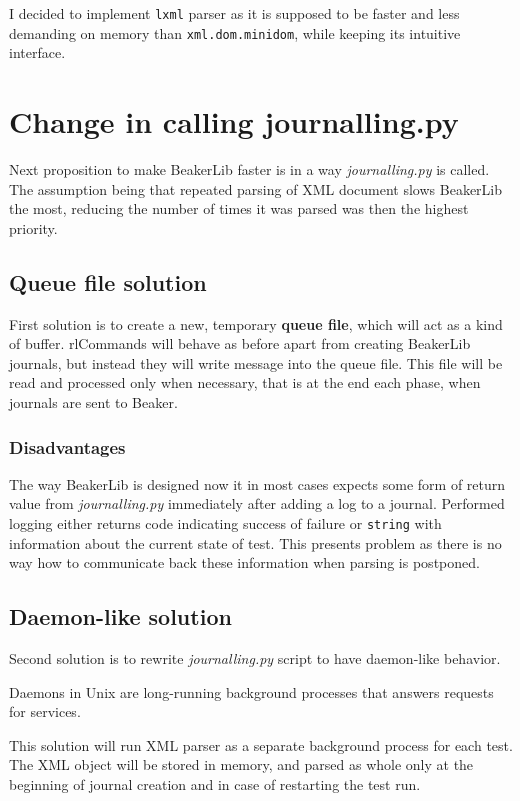 I decided to implement \texttt{lxml} parser as it is supposed to be faster and less demanding on memory than \texttt{xml.dom.minidom}\cite{lxml_performance}, while keeping its intuitive interface.

\section{Change in calling journalling.py}
Next proposition to make BeakerLib faster is in a way \textit{journalling.py} is called. The assumption being that repeated parsing of XML document slows BeakerLib the most, reducing the number of times it was parsed was then the highest priority. 

\subsection{Queue file solution}  %
First solution is to create a new, temporary \textbf{queue file}, which will act as a kind of buffer. \mbox{rlCommands} will behave as before apart from creating BeakerLib journals, but instead they will write message into the queue file. This file will be read and processed only when necessary, that is at the end each phase, when journals are sent to Beaker.

\subsubsection{Disadvantages}
The way BeakerLib is designed now it in most cases expects some form of return value from \textit{journalling.py} immediately after adding a log to a journal. Performed logging either returns code indicating success of failure or \texttt{string} with information about the current state of test. This presents problem as there is no way how to communicate back these information when parsing is postponed. 

\subsection{Daemon-like solution}
Second solution is to rewrite \textit{journalling.py} script to have daemon-like behavior. 

Daemons in Unix are long-running background processes that answers requests for services\cite{daemon_explanation}.

This solution will run XML parser as a separate background process for each test. The XML object will be stored in memory, and parsed as whole only at the beginning of journal creation and in case of restarting the test run.  

